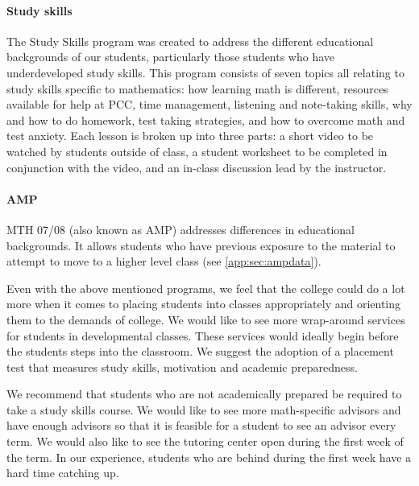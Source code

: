 \paragraph{ Study skills}
The Study Skills program was created to address the different educational backgrounds of our students, particularly those students who have underdeveloped study skills. This program consists of seven topics all relating to study skills specific to mathematics: how learning math is different, resources available for help at PCC, time management, listening and note-taking skills, why and how to do homework, test taking strategies, and how to overcome math and test anxiety.  Each lesson is broken up into three parts: a short video to be watched by students outside of class, a student worksheet to be completed in conjunction with the video, and an in-class discussion lead by the instructor. 

\paragraph{AMP}
MTH 07/08 (also known as AMP) addresses differences in educational backgrounds. It allows students who have previous exposure to the material to attempt to move to a higher level class (see \vref{app:sec:ampdata}).

 Even with the above mentioned programs, we feel that the college could do a lot more when it comes to placing students into classes appropriately and orienting them to the demands of college. We would like to see more wrap-around services for students in developmental classes. These services would ideally begin before the students steps into the classroom. We suggest the adoption of a placement test that measures study skills, motivation and academic preparedness. 

 We recommend that students who are not academically prepared be required to take a study skills course. We would like to see more math-specific advisors and have enough advisors so that it is feasible for a student to see an advisor every term.  We would also like to see the tutoring center open during the first week of the term. In our experience, students who are behind during the first week have a hard time catching up.

